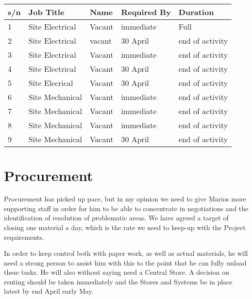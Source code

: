 \begin{longtable}{lll ll}
\toprule
s/n   &  Job Title                                                      & Name                       &Required By    &  Duration\\
\midrule
1     &  Site Electrical                          & Vacant        		   & immediate    & Full  \\
2     &  Site Electrical                          & vacant    			   &  30 April  & end of activity  \\ 
3     &  Site Electrical                          & Vacant                      &  immediate   & end of activity \\ 
4     &  Site Electrical                          & Vacant                      & 30 April   & end of activity\\
5     &  Site Elecrical                           & Vacant                      &  30 April  & end of activity\\
6     &  Site Mechanical                       & Vacant                      &  immediate  & end of activity\\
7     &  Site Mechanical                       & Vacant                      &   immediate & end of activity\\
8     &  Site Mechanical                       & Vacant                      &  immediate  & end of activity\\
9     &  Site Mechanical                       & Vacant                      &  30 April  & end of activity\\

\bottomrule
\end{longtable}
\section*{Procurement}

Procurement has picked up pace, but in my opinion we need to give Marios more supporting staff in order for him to be able to concentrate in negotiations and the identification of resolution of problematic areas. We have agreed a target of closing one material a day, which is the rate we need to keep-up with the Project requirements. 

In order to keep control both with paper work, as well as actual materials, he will need a strong person to assist him with this to the point that he can fully unload these tasks. He will also without saying need a Central Store. A decision on renting should be taken immediately and the Stores and Systems be in place latest by end April early May. 

